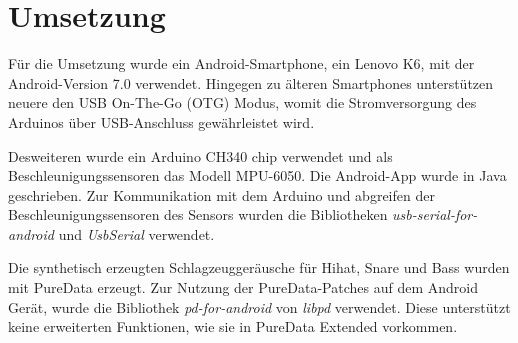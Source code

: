 \section{Umsetzung}
Für die Umsetzung wurde ein Android-Smartphone, ein Lenovo K6, mit der Android-Version 7.0 verwendet.
Hingegen zu älteren Smartphones unterstützen neuere den USB On-The-Go (OTG) Modus, womit die Stromversorgung des Arduinos über USB-Anschluss gewährleistet wird.

Desweiteren wurde ein Arduino CH340 chip verwendet und als Beschleunigungssensoren das Modell MPU-6050.
Die Android-App wurde in Java geschrieben.
Zur Kommunikation mit dem Arduino und abgreifen der Beschleunigungssensoren des Sensors wurden die Bibliotheken \textit{usb-serial-for-android} \cite{mik3y} und \textit{UsbSerial} \cite{felHR85} verwendet.

Die synthetisch erzeugten Schlagzeuggeräusche für Hihat, Snare und Bass wurden mit PureData \cite{puredata} erzeugt. 
Zur Nutzung der PureData-Patches auf dem Android Gerät, wurde die Bibliothek \textit{pd-for-android} \cite{pdAndroid} von \textit{libpd} verwendet.
Diese unterstützt keine erweiterten Funktionen, wie sie in PureData Extended vorkommen.

